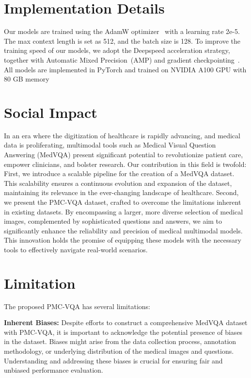 \documentclass{article}
\begin{document}
\section{Implementation Details}
\label{sec:implement}
Our models are trained using the AdamW optimizer~\cite {loshchilov2017decoupled} with a learning rate 2e-5.
The max context length is set as 512, and the batch size is 128.
To improve the training speed of our models,
we adopt the Deepspeed acceleration strategy, together with Automatic Mixed Precision~(AMP) and gradient checkpointing~\cite{feng2021optimal}.
All models are implemented in PyTorch and trained on NVIDIA A100 GPU with 80 GB memory


\section{Social Impact}
In an era where the digitization of healthcare is rapidly advancing, and medical data is proliferating, multimodal tools such as Medical Visual Question Answering (MedVQA) present significant potential to revolutionize patient care, empower clinicians, and bolster research. Our contribution in this field is twofold:
First, we introduce a scalable pipeline for the creation of a MedVQA dataset. This scalability ensures a continuous evolution and expansion of the dataset, maintaining its relevance in the ever-changing landscape of healthcare.
Second, we present the PMC-VQA dataset, crafted to overcome the limitations inherent in existing datasets. By encompassing a larger, more diverse selection of medical images, complemented by sophisticated questions and answers, we aim to significantly enhance the reliability and precision of medical multimodal models. This innovation holds the promise of equipping these models with the necessary tools to effectively navigate real-world scenarios.


\section{Limitation}
The proposed PMC-VQA has several limitations:


\noindent \textbf{Inherent Biases:} Despite efforts to construct a comprehensive MedVQA dataset with PMC-VQA, it is important to acknowledge the potential presence of biases in the dataset. Biases might arise from the data collection process, annotation methodology, or underlying distribution of the medical images and questions. Understanding and addressing these biases is crucial for ensuring fair and unbiased performance evaluation.
\end{document}
